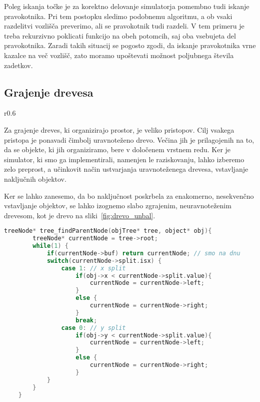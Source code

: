 \documentclass[a4paper,12pt]{article}
\begin{document}
Poleg iskanja točke je za korektno delovanje simulatorja pomembno tudi iskanje pravokotnika. Pri tem postopku
sledimo podobnemu algoritmu, a ob vsaki razdelitvi vozlišča preverimo, ali se pravokotnik tudi razdeli. V tem
primeru je treba rekurzivno poklicati funkcijo na obeh potomcih, saj oba vsebujeta del pravokotnika. Zaradi takih
situacij se pogosto zgodi, da iskanje pravokotnika vrne kazalce na več vozlišč, zato moramo upoštevati možnost
poljubnega števila zadetkov.
\subsection{Grajenje drevesa}

\begin{wrapfigure}{r}{0.6\textwidth}
    \centering
    
    \caption{Neuravnoteženo drevo, če vstavljamo objekte, urejene po koordinatah.}%
    \label{fig:drevo_unbal}
\end{wrapfigure}

Za grajenje dreves, ki organizirajo prostor, je veliko pristopov. Cilj vsakega pristopa je ponavadi čimbolj
uravnoteženo drevo. Večina jih je prilagojenih na to, da se objekte, ki jih organiziramo, bere v določenem
vrstnem redu. Ker je simulator, ki smo ga implementirali, namenjen le raziskovanju, lahko izberemo zelo 
preprost, a učinkovit način ustvarjanja uravnoteženega drevesa, vstavljanje naključnih objektov.


Ker se lahko zanesemo, da bo naključnost poskrbela za enakomerno, nesekvenčno vstavljanje objektov, se lahko
izognemo slabo zgrajenim, neuravnoteženim drevesom, kot je drevo na sliki~\ref{fig:drevo_unbal}.

\begin{lstlisting}[float, caption={Iskanje vozlišča, ki vsebuje objekt}, label=find_parent_node, language=C]
    treeNode* tree_findParentNode(objTree* tree, object* obj){
        treeNode* currentNode = tree->root;
        while(1) {
            if(currentNode->buf) return currentNode; // smo na dnu
            switch(currentNode->split.isx) {
                case 1: // x split
                    if(obj->x < currentNode->split.value){
                        currentNode = currentNode->left;
                    }
                    else {
                        currentNode = currentNode->right;
                    }
                    break;
                case 0: // y split
                    if(obj->y < currentNode->split.value){
                        currentNode = currentNode->left;
                    }
                    else {
                        currentNode = currentNode->right;
                    }
            }
        }
    }
\end{lstlisting}
\end{document}
